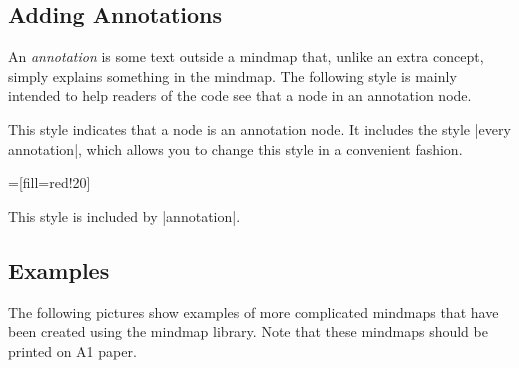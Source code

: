 \subsection{Adding Annotations}

An \emph{annotation} is some text outside a mindmap that, unlike an
extra concept, simply explains something in the mindmap. The following
style is mainly intended to help readers of the code see that a node
in an annotation node.

\begin{itemize}
  This style indicates that a node is an annotation node. It includes
  the style |every annotation|, which allows you to change this style
  in a convenient fashion.
\begin{codeexample}[]
=[fill=red!20]    
\end{codeexample}
    This style is included by |annotation|.
\end{itemize}


\subsection{Examples}

The following pictures show examples of more complicated mindmaps that
have been created using the mindmap library. Note that these mindmaps
should be printed on A1 paper.

\medskip
\noindent
{}

\medskip
\noindent
{}



